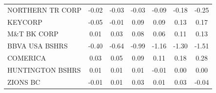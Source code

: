 \documentclass[11pt]{article}
\begin{document}
\begin{table}
\begin{tabular}{|l|c|c|c|c|c|c|}
NORTHERN TR CORP      &-0.02&-0.03&-0.03&-0.09&-0.18&-0.25\\
KEYCORP               &-0.05&-0.01&0.09&0.09&0.13&0.17\\    
M\&T BK CORP          &0.01&0.03&0.08&0.06&0.11&0.13\\      
BBVA USA BSHRS        &-0.40&-0.64&-0.99&-1.16&-1.30&-1.51\\
COMERICA              &0.03&0.05&0.09&0.11&0.18&0.28\\      
HUNTINGTON BSHRS      &0.01&0.01&0.01&-0.01&0.00&0.00\\     
ZIONS BC              &-0.01&0.01&0.03&0.01&0.03&-0.04\\    
\hline                                                      
\end{tabular}                                               
\end{table}                                                 
\end{document}
